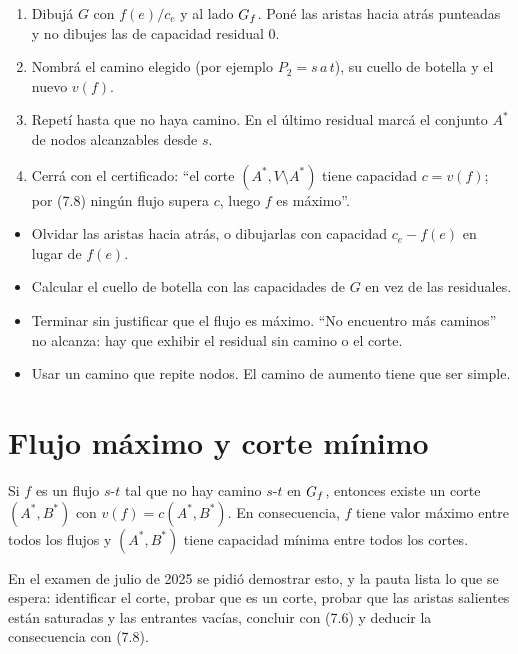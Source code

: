 \begin{receta}
\begin{enumerate}
  \item Dibujá $G$ con $f(e)/c_e$ y al lado $G_f$. Poné las aristas hacia atrás punteadas y no dibujes las de capacidad residual $0$.
  \item Nombrá el camino elegido (por ejemplo $P_2=s\,a\,t$), su cuello de botella y el nuevo $v(f)$.
  \item Repetí hasta que no haya camino. En el último residual marcá el conjunto $A^*$ de nodos alcanzables desde $s$.
  \item Cerrá con el certificado: ``el corte $(A^*,V\setminus A^*)$ tiene capacidad $c=v(f)$; por (7.8) ningún flujo supera $c$, luego $f$ es máximo''.
\end{enumerate}
\end{receta}

\begin{trampa}
\begin{itemize}
  \item Olvidar las aristas hacia atrás, o dibujarlas con capacidad $c_e-f(e)$ en lugar de $f(e)$.
  \item Calcular el cuello de botella con las capacidades de $G$ en vez de las residuales.
  \item Terminar sin justificar que el flujo es máximo. ``No encuentro más caminos'' no alcanza: hay que exhibir el residual sin camino o el corte.
  \item Usar un camino que repite nodos. El camino de aumento tiene que ser simple.
\end{itemize}
\end{trampa}

\section{Flujo máximo y corte mínimo}

\begin{resultado}[(7.9)]
Si $f$ es un flujo $s$-$t$ tal que no hay camino $s$-$t$ en $G_f$, entonces existe un corte $(A^*,B^*)$ con $v(f)=c(A^*,B^*)$. En consecuencia, $f$ tiene valor máximo entre todos los flujos y $(A^*,B^*)$ tiene capacidad mínima entre todos los cortes.
\end{resultado}

En el examen de julio de 2025 se pidió demostrar esto, y la pauta lista lo que se espera: identificar el corte, probar que es un corte, probar que las aristas salientes están saturadas y las entrantes vacías, concluir con (7.6) y deducir la consecuencia con (7.8).

